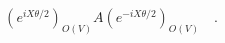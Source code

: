 \begin{equation}
\left( e^{iX\theta /2} \right)_{O(V)} A \left( e^{-iX\theta /2}
\right)_{O(V)} \quad .	
\label{eq:orthrot}
\end{equation}

